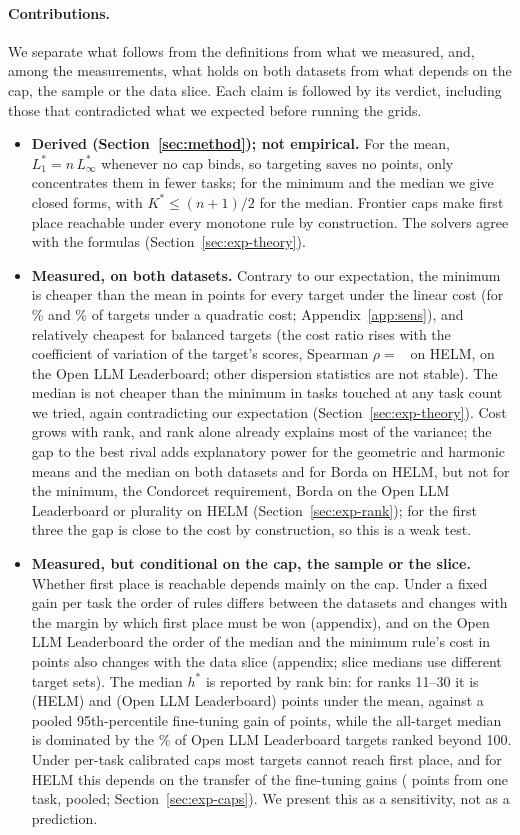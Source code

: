 \paragraph{Contributions.} We separate what follows from the definitions from what we measured, and, among the measurements, what holds on both datasets from what depends on the cap, the sample or the data slice. Each claim is followed by its verdict, including those that contradicted what we expected before running the grids.
\begin{itemize}
\item \textbf{Derived (Section~\ref{sec:method}); not empirical.} For the mean, $L_1^\ast=n\,L_\infty^\ast$ whenever no cap binds, so targeting saves no points, only concentrates them in fewer tasks; for the minimum and the median we give closed forms, with $K^\ast\le(n+1)/2$ for the median. Frontier caps make first place reachable under every monotone rule by construction. The solvers agree with the formulas (Section~\ref{sec:exp-theory}).
\item \textbf{Measured, on both datasets.} Contrary to our expectation, the minimum is cheaper than the mean in points for every target under the linear cost (for \cvxHelmQuadraticShare\% and \cvxOllbQuadraticShare\% of targets under a quadratic cost; Appendix~\ref{app:sens}), and relatively cheapest for balanced targets (the cost ratio rises with the coefficient of variation of the target's scores, Spearman $\rho=$~\ctwoHelmRho{} on HELM, \ctwoOllbRho{} on the Open LLM Leaderboard; other dispersion statistics are not stable). The median is not cheaper than the minimum in tasks touched at any task count we tried, again contradicting our expectation (Section~\ref{sec:exp-theory}). Cost grows with rank, and rank alone already explains most of the variance; the gap to the best rival adds explanatory power for the geometric and harmonic means and the median on both datasets and for Borda on HELM, but not for the minimum, the Condorcet requirement, Borda on the Open LLM Leaderboard or plurality on HELM (Section~\ref{sec:exp-rank}); for the first three the gap is close to the cost by construction, so this is a weak test.
\item \textbf{Measured, but conditional on the cap, the sample or the slice.} Whether first place is reachable depends mainly on the cap. Under a fixed gain per task the order of rules differs between the datasets and changes with the margin by which first place must be won (appendix), and on the Open LLM Leaderboard the order of the median and the minimum rule's cost in points also changes with the data slice (appendix; slice medians use different target sets). The median $h^\ast$ is reported by rank bin: for ranks 11--30 it is \hstarBinHelmMeanElevenThirty{} (HELM) and \hstarBinOllbMeanElevenThirty{} (Open LLM Leaderboard) points under the mean, against a pooled 95th-percentile fine-tuning gain of \empPooled{} points, while the all-target median is dominated by the \ollbShareOverHundred\% of Open LLM Leaderboard targets ranked beyond 100. Under per-task calibrated caps most targets cannot reach first place, and for HELM this depends on the transfer of the fine-tuning gains (\empMmluQ{} points from one task, \empPooled{} pooled; Section~\ref{sec:exp-caps}). We present this as a sensitivity, not as a prediction.

\end{itemize}
